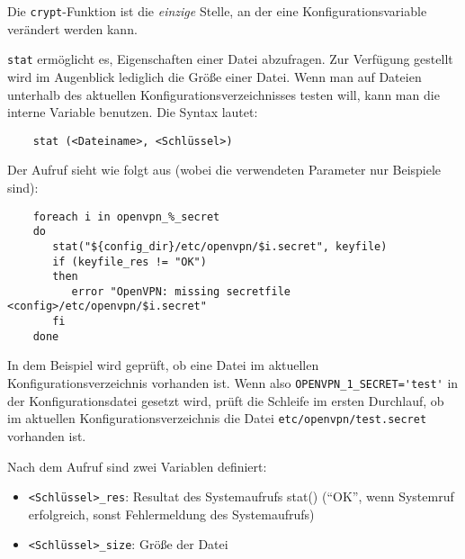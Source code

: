 Die \texttt{crypt}-Funktion ist die \emph{einzige} Stelle, an der eine
Konfigurationsvariable verändert werden kann.


    \texttt{stat} ermöglicht es, Eigenschaften einer Datei abzufragen. Zur
    Verfügung gestellt wird im Augenblick lediglich die Größe einer
    Datei. Wenn man
    auf Dateien unterhalb des aktuellen Konfigurationsverzeichnisses testen
    will, kann man die interne Variable  benutzen. Die Syntax
    lautet:

\begin{example}
\begin{verbatim}
    stat (<Dateiname>, <Schlüssel>)
\end{verbatim}
\end{example}

    Der Aufruf sieht wie folgt aus (wobei die
    verwendeten Parameter nur Beispiele sind):

\begin{example}
\begin{verbatim}
    foreach i in openvpn_%_secret
    do
       stat("${config_dir}/etc/openvpn/$i.secret", keyfile)
       if (keyfile_res != "OK")
       then
          error "OpenVPN: missing secretfile <config>/etc/openvpn/$i.secret"
       fi
    done
\end{verbatim}
\end{example}

    In dem Beispiel wird geprüft, ob eine Datei im aktuellen
    Konfigurationsverzeichnis vorhanden ist. Wenn also \verb+OPENVPN_1_SECRET='test'+
    in der Konfigurationsdatei gesetzt wird, prüft die Schleife im ersten
    Durchlauf, ob im aktuellen  Konfigurationsverzeichnis die Datei
    \texttt{etc/openvpn/test.secret} vorhanden ist.

    Nach dem Aufruf sind zwei Variablen definiert:

    \begin{itemize}
    \item \texttt{<Schlüssel>\_res}: Resultat des Systemaufrufs stat() ("`OK"', wenn
      Systemruf erfolgreich, sonst Fehlermeldung des Systemaufrufs)
    \item \texttt{<Schlüssel>\_size}: Größe der Datei
    \end{itemize}

